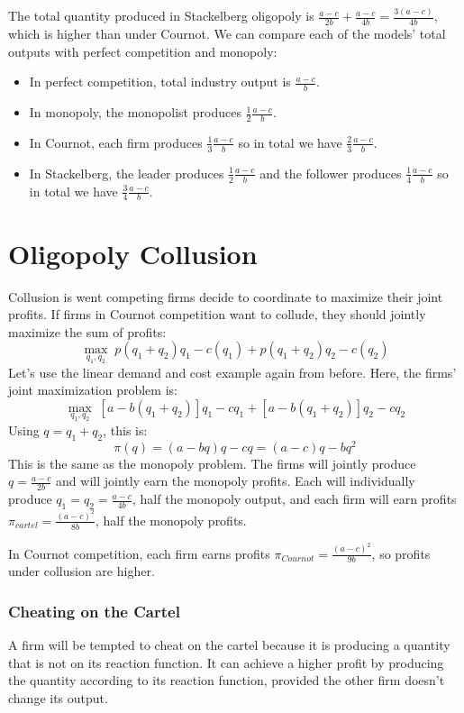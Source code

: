 \documentclass{article}
\begin{document}
The total quantity produced in Stackelberg oligopoly is $\frac{a-c}{2b}+\frac{a-c}{4b}=\frac{3\left( a-c \right)}{4b}$, which is higher than under Cournot.
We can compare each of the models' total outputs with perfect competition and monopoly:
\begin{itemize}
  \item In perfect competition, total industry output is $\frac{a-c}{b}$.
  \item In monopoly, the monopolist produces $\frac{1}{2}\frac{a-c}{b}$.
  \item In Cournot, each firm produces $\frac{1}{3}\frac{a-c}{b}$ so in total we have $\frac{2}{3}\frac{a-c}{b}$.
  \item In Stackelberg, the leader produces $\frac{1}{2}\frac{a-c}{b}$ and the follower produces $\frac{1}{4}\frac{a-c}{b}$ so in total we have $\frac{3}{4}\frac{a-c}{b}$.
\end{itemize}
\section{Oligopoly Collusion}
Collusion is went competing firms decide to coordinate to maximize their joint profits. If firms in Cournot competition want to collude, they should jointly maximize the sum of profits:
\[
  \underset{q_1,q_2}{\max}\; p\left( q_1+q_2 \right)q_1-c\left( q_1 \right) +p\left( q_1+q_2 \right)q_2 -c\left( q_2 \right)
\]
Let's use the linear demand and cost example again from before. Here, the firms' joint maximization problem is:
\[
\underset{q_1,q_2}{\max}\; \left[ a-b\left( q_1+q_2 \right) \right]q_1-cq_1+\left[ a-b\left( q_1+q_2 \right) \right]q_2 -cq_2
\]
Using $q=q_1+q_2$, this is:
\[
  \pi\left( q \right)= \left( a-bq \right)q - cq = \left( a-c \right)q-bq^2
\]
This is the same as the monopoly problem. The firms will jointly produce $q=\frac{a-c}{2b}$ and will jointly earn the monopoly profits. Each will individually produce $q_1=q_2=\frac{a-c}{4b}$, half the monopoly output, and each firm will earn profits $\pi_{cartel}=\frac{\left( a-c \right)^2}{8b}$, half the monopoly profits.

In Cournot competition, each firm earns profits $\pi_{Cournot}=\frac{\left( a-c
\right)^2}{9b}$, so profits under collusion are higher.
\subsubsection*{Cheating on the Cartel}
A firm will be tempted to cheat on the cartel because it is producing a quantity that is not on its reaction function. It can achieve a higher profit by producing the quantity according to its reaction function, provided the other firm doesn't change its output.
\end{document}

